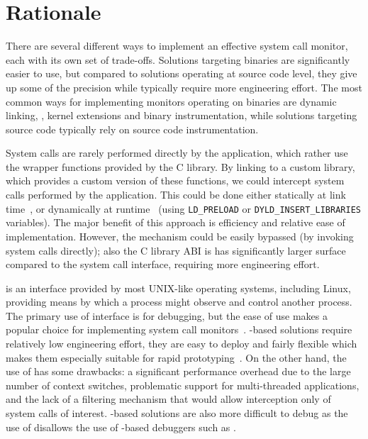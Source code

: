 \section{Rationale}
\label{multi-version:rationale}

There are several different ways to implement an effective system call monitor,
each with its own set of trade-offs. Solutions targeting binaries are
significantly easier to use, but compared to solutions operating at source code
level, they give up some of the precision while typically require more
engineering effort. The most common ways for implementing monitors operating on
binaries are dynamic linking, \ptrace, kernel extensions and binary
instrumentation, while solutions targeting source code typically rely on source
code instrumentation.

System calls are rarely performed directly by the application, which rather use
the wrapper functions provided by the C library. By linking to a custom
library, which provides a custom version of these functions, we could intercept
system calls performed by the application. This could be done either statically
at link time~\cite{plash}, or dynamically at runtime~\cite{shepherding:pldi14}
(\eg using \lstinline`LD_PRELOAD` or \lstinline`DYLD_INSERT_LIBRARIES`
variables). The major benefit of this approach is efficiency and relative ease
of implementation. However, the mechanism could be easily bypassed (\eg by
invoking system calls directly); also the C library ABI is has significantly
larger surface compared to the system call interface, requiring more
engineering effort.

\ptrace is an interface provided by most UNIX-like operating systems, including
Linux, providing means by which a process might observe and control another
process. The primary use of \ptrace interface is for debugging, but the ease of
use makes \ptrace a popular choice for implementing system call
monitors~\cite{wily-hacker,orchestra09,tachyon12}. \ptrace-based solutions
require relatively low engineering effort, they are easy to deploy and fairly
flexible which makes them especially suitable for rapid
prototyping~\cite{spillane07}. On the other hand, the use of \ptrace has some
drawbacks: a significant performance overhead due to the large number of
context switches, problematic support for multi-threaded applications, and the
lack of a filtering mechanism that would allow interception only of system
calls of interest. \ptrace-based solutions are also more difficult to debug as
the use of \ptrace disallows the use of \ptrace-based debuggers such as \gdb.

